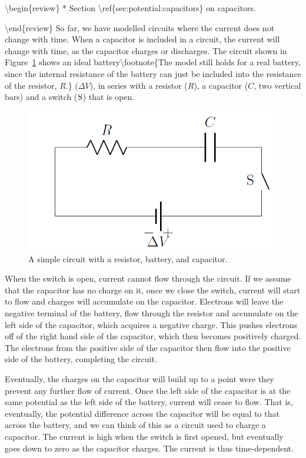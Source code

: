 {\textbackslash}begin\{review\}
* Section {\textbackslash}ref\{sec:potential:capacitors\} on capacitors.

{\textbackslash}end\{review\}
So far, we have modelled circuits where the current does not change with time. When a capacitor is included in a circuit, the current will change with time, as the capacitor charges or discharges. The circuit shown in Figure~\ref{fig:circuits:RCcircuit} shows an ideal battery{\textbackslash}footnote\{The model still holds for a real battery, since the internal resistance of the battery can just be included into the resistance of the resistor, $R$.\} ($\Delta V$), in series with a resistor ($R$), a capacitor ($C$, two vertical bars) and a switch (${\rm S}$) that is open.

\begin{figure}[!htbp]
\centering
\includegraphics[width=0.4\linewidth]{files/RCcircuit-ed0f38181d5ef64b678a6171d86d88e5.png}
\caption[]{A simple circuit with a resistor, battery, and capacitor.}
\label{fig:circuits:RCcircuit}
\end{figure}

When the switch is open, current cannot flow through the circuit. If we assume that the capacitor has no charge on it, once we close the switch, current will start to flow and charges will accumulate on the capacitor. Electrons will leave the negative terminal of the battery, flow through the resistor and accumulate on the left side of the capacitor, which acquires a negative charge. This pushes electrons off of the right hand side of the capacitor, which then becomes positively charged. The electrons from the positive side of the capacitor then flow into the positive side of the battery, completing the circuit.

Eventually, the charges on the capacitor will build up to a point were they prevent any further flow of current. Once the left side of the capacitor is at the same potential as the left side of the battery, current will cease to flow. That is, eventually, the potential difference across the capacitor will be equal to that across the battery, and we can think of this as a circuit used to charge a capacitor. The current is high when the switch is first opened, but eventually goes down to zero as the capacitor charges. The current is thus time-dependent.

